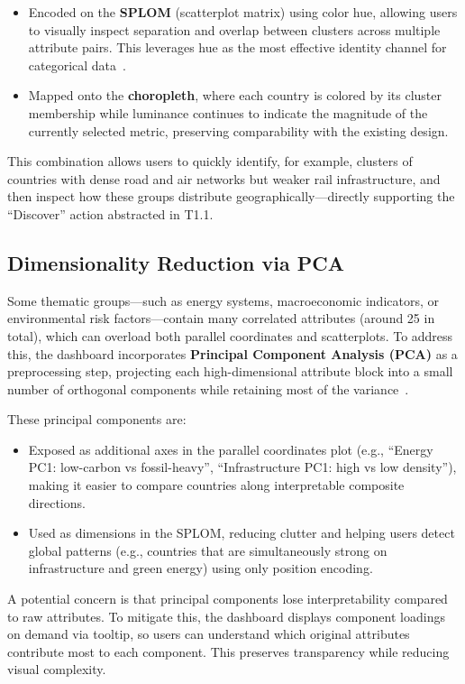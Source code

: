 \documentclass{vgtc}                          %
\begin{document}
\begin{itemize}
    \item Encoded on the \textbf{SPLOM} (scatterplot matrix) using color hue, allowing users to visually inspect separation and overlap between clusters across multiple attribute pairs. This leverages hue as the most effective identity channel for categorical data~\cite{munzner2014visualization}.
    \item Mapped onto the \textbf{choropleth}, where each country is colored by its cluster membership while luminance continues to indicate the magnitude of the currently selected metric, preserving comparability with the existing design.
\end{itemize}

This combination allows users to quickly identify, for example, clusters of countries with dense road and air networks but weaker rail infrastructure, and then inspect how these groups distribute geographically---directly supporting the ``Discover'' action abstracted in T1.1.

\subsection{Dimensionality Reduction via PCA}
Some thematic groups---such as energy systems, macroeconomic indicators, or environmental risk factors---contain many correlated attributes (around 25 in total), which can overload both parallel coordinates and scatterplots. To address this, the dashboard incorporates \textbf{Principal Component Analysis (PCA)} as a preprocessing step, projecting each high-dimensional attribute block into a small number of orthogonal components while retaining most of the variance~\cite{jolliffe2016pca}.

These principal components are:
\begin{itemize}
    \item Exposed as additional axes in the parallel coordinates plot (e.g., ``Energy PC1: low-carbon vs fossil-heavy'', ``Infrastructure PC1: high vs low density''), making it easier to compare countries along interpretable composite directions.
    \item Used as dimensions in the SPLOM, reducing clutter and helping users detect global patterns (e.g., countries that are simultaneously strong on infrastructure and green energy) using only position encoding.
\end{itemize}

A potential concern is that principal components lose interpretability compared to raw attributes. To mitigate this, the dashboard displays component loadings on demand via tooltip, so users can understand which original attributes contribute most to each component. This preserves transparency while reducing visual complexity.
\end{document}
